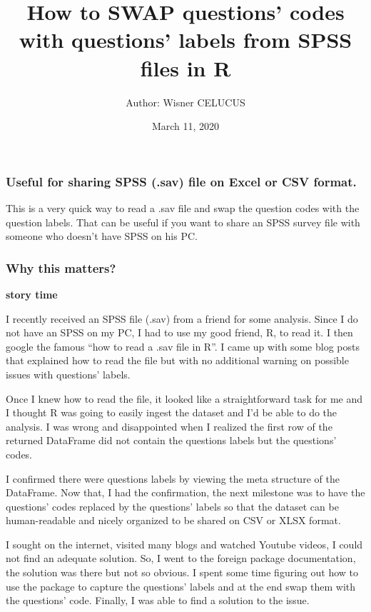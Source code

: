 \documentclass[]{article}
\title{How to SWAP questions' codes with questions' labels from SPSS files in R}
\author{Author: Wisner CELUCUS}
\date{March 11, 2020}
\begin{document}
\maketitle

\hypertarget{useful-for-sharing-spss-.sav-file-on-excel-or-csv-format.}{%
\subsubsection{Useful for sharing SPSS (.sav) file on Excel or CSV
format.}\label{useful-for-sharing-spss-.sav-file-on-excel-or-csv-format.}}

This is a very quick way to read a .sav file and swap the question codes
with the question labels. That can be useful if you want to share an
SPSS survey file with someone who doesn't have SPSS on his PC.

\hypertarget{why-this-matters}{%
\subsubsection{Why this matters?}\label{why-this-matters}}

\textbf{story time}

I recently received an SPSS file (.sav) from a friend for some analysis.
Since I do not have an SPSS on my PC, I had to use my good friend, R, to
read it. I then google the famous ``how to read a .sav file in R''. I
came up with some blog posts that explained how to read the file but
with no additional warning on possible issues with questions' labels.

Once I knew how to read the file, it looked like a straightforward task
for me and I thought R was going to easily ingest the dataset and I'd be
able to do the analysis. I was wrong and disappointed when I realized
the first row of the returned DataFrame did not contain the questions
labels but the questions' codes.

I confirmed there were questions labels by viewing the meta structure of
the DataFrame. Now that, I had the confirmation, the next milestone was
to have the questions' codes replaced by the questions' labels so that
the dataset can be human-readable and nicely organized to be shared on
CSV or XLSX format.

I sought on the internet, visited many blogs and watched Youtube videos,
I could not find an adequate solution. So, I went to the foreign package
documentation, the solution was there but not so obvious. I spent some
time figuring out how to use the package to capture the questions'
labels and at the end swap them with the questions' code. Finally, I was
able to find a solution to the issue.
\end{document}
